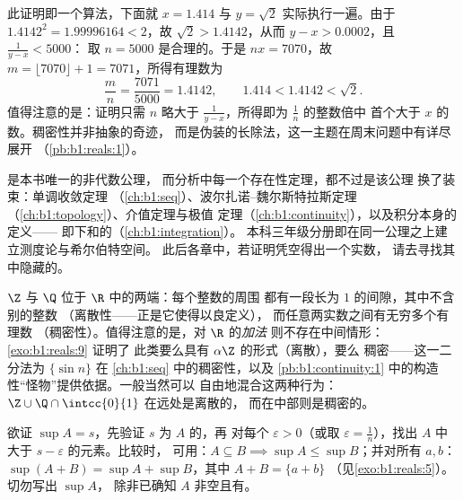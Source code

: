\begin{example}[稠密性证明的实际运行]\label{ex:b1:reals:densityrun}
此证明即一个算法，下面就 $x = 1.414$ 与
$y = \sqrt 2$ 实际执行一遍。由于 $1.4142^2 = 1.99996164 < 2$，故 $\sqrt 2
> 1.4142$，从而 $y - x > 0.0002$，且 $\frac{1}{y - x} < 5000$：
取 $n = 5000$ 是合理的。于是 $nx = 7070$，故 $m = \lfloor
7070 \rfloor + 1 = 7071$，所得有理数为
\[
\frac{m}{n} = \frac{7071}{5000} = 1.4142,
\qquad
1.414 < 1.4142 < \sqrt 2 .
\]
值得注意的是：证明只需 $n$ 略大于
$\frac{1}{y-x}$，所得即为 $\frac 1n$ 的整数倍中
首个大于 $x$ 的数。稠密性并非抽象的奇迹，
而是伪装的长除法，这一主题在周末问题中有详尽展开
（\cref{pb:b1:reals:1}）。
\end{example}

\begin{remark}[完备性接下来在何处使用]
 是本书唯一的非代数公理，
而分析中每一个存在性定理，都不过是该公理
换了装束：单调收敛定理
（\cref{ch:b1:seq}）、波尔扎诺--魏尔斯特拉斯定理
（\cref{ch:b1:topology}）、介值定理与极值
定理（\cref{ch:b1:continuity}），以及积分本身的定义——
即下和的（\cref{ch:b1:integration}）。
本科三年级分册即在同一公理之上建立测度论与希尔伯特空间。
此后各章中，若证明凭空得出一个实数，
请去寻找其中隐藏的。
\end{remark}

\begin{remark}[离散性与稠密性之间]
$\Z$ 与 $\Q$ 位于 $\R$ 中的两端：每个整数的周围
都有一段长为 $1$ 的间隙，其中不含别的整数
（离散性——正是它使得以良定义），
而任意两实数之间有无穷多个有理数
（稠密性）。值得注意的是，对 $\R$ 的\emph{加法}
则不存在中间情形：\cref{exo:b1:reals:9} 证明了
此类要么具有 $\alpha\Z$ 的形式（离散），要么
稠密——这一二分法为 $\{\sin n\}$ 在
\cref{ch:b1:seq} 中的稠密性，以及
\cref{pb:b1:continuity:1} 中的构造性“怪物”提供依据。一般当然可以
自由地混合这两种行为：$\Z \cup \Q\cap\intcc{0}{1}$ 在远处是离散的，
而在中部则是稠密的。
\end{remark}

\begin{method}[用上确界与下确界证明等式]\label{met:b1:reals:supproofs}
欲证 $\sup A = s$，先验证 $s$ 为 $A$ 的，再
对每个 $\varepsilon > 0$（或取 $\varepsilon = \frac
1n$），找出 $A$ 中大于 $s - \varepsilon$ 的元素。比较时，
可用：$A \subseteq B \implies \sup A \leq \sup B$；并对所有 $a, b$：
$\sup(A + B) = \sup A + \sup B$，其中 $A + B = \{a + b\}$
（见\cref{exo:b1:reals:5}）。切勿写出 $\sup A$，
除非已确知 $A$ 非空且有。
\end{method}

